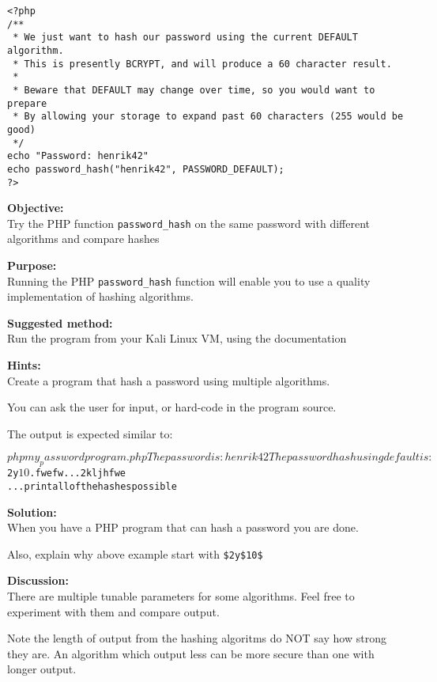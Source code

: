 \documentclass[a4paper,11pt,notitlepage]{report}
\begin{document}
\begin{verbatim}
<?php
/**
 * We just want to hash our password using the current DEFAULT algorithm.
 * This is presently BCRYPT, and will produce a 60 character result.
 *
 * Beware that DEFAULT may change over time, so you would want to prepare
 * By allowing your storage to expand past 60 characters (255 would be good)
 */
echo "Password: henrik42"
echo password_hash("henrik42", PASSWORD_DEFAULT);
?>
\end{verbatim}

{\bf Objective:}\\
Try the PHP function \verb+password_hash+ on the same password with different algorithms and compare hashes


{\bf Purpose:}\\
Running the PHP \verb+password_hash+ function will enable you to use a quality implementation of hashing algorithms.


{\bf Suggested method:}\\
Run the program from your Kali Linux VM, using the documentation\\


{\bf Hints:}\\
Create a program that hash a password using multiple algorithms.

You can ask the user for input, or hard-code in the program source.

The output is expected similar to:

\begin{alltt}
$ php my_passwordprogram.php
The password is: henrik42
The password hash using default is: $2y$10$.fwefw...2kljhfwe
... print all of the hashes possible
\end{alltt}


{\bf Solution:}\\
When you have a PHP program that can hash a password you are done.

Also, explain why above example start with \verb+$2y$10$+

{\bf Discussion:}\\
There are multiple tunable parameters for some algorithms. Feel free to experiment with them and compare output.

Note the length of output from the hashing algoritms do NOT say how strong they are. An algorithm which output less can be more secure than one with longer output.
\end{document}
